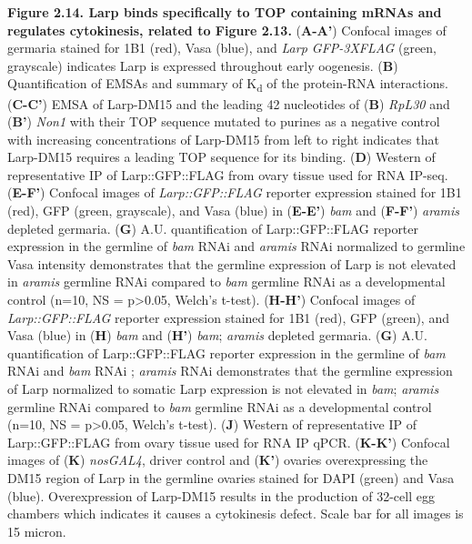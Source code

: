 \documentclass[12pt,oneside]{reedthesis}
\begin{document}
\textbf{\hfill\break
}

\textbf{Figure 2.14. Larp binds specifically to TOP containing mRNAs and regulates cytokinesis, related to Figure 2.13.}
(\textbf{A-A'}) Confocal images of germaria stained for 1B1 (red), Vasa (blue), and \emph{Larp
GFP-3XFLAG} (green, grayscale) indicates Larp is expressed throughout
early oogenesis. (\textbf{B}) Quantification of EMSAs and summary of K\textsubscript{d} of
the protein-RNA interactions. (\textbf{C-C'}) EMSA of Larp-DM15 and the
leading 42 nucleotides of (\textbf{B}) \emph{RpL30} and (\textbf{B'}) \emph{Non1} with their
TOP sequence mutated to purines as a negative control with increasing
concentrations of Larp-DM15 from left to right indicates that Larp-DM15
requires a leading TOP sequence for its binding. (\textbf{D}) Western of
representative IP of Larp::GFP::FLAG from ovary tissue used for RNA
IP-seq. (\textbf{E-F'}) Confocal images of \emph{Larp::GFP::FLAG} reporter
expression stained for 1B1 (red), GFP (green, grayscale), and Vasa
(blue) in (\textbf{E-E'}) \emph{bam} and (\textbf{F-F'}) \emph{aramis} depleted germaria.
(\textbf{G}) A.U. quantification of Larp::GFP::FLAG reporter expression in
the germline of \emph{bam} RNAi and \emph{aramis} RNAi normalized to germline Vasa
intensity demonstrates that the germline expression of Larp is not
elevated in \emph{aramis} germline RNAi compared to \emph{bam} germline RNAi as a
developmental control (n=10, NS = p\textgreater0.05, Welch's t-test). (\textbf{H-H'})
Confocal images of \emph{Larp::GFP::FLAG} reporter expression stained for 1B1
(red), GFP (green), and Vasa (blue) in (\textbf{H}) \emph{bam} and (\textbf{H'}) \emph{bam};
\emph{aramis} depleted germaria. (\textbf{G}) A.U. quantification of
Larp::GFP::FLAG reporter expression in the germline of \emph{bam} RNAi and
\emph{bam} RNAi ; \emph{aramis} RNAi demonstrates that the germline expression of
Larp normalized to somatic Larp expression is not elevated in \emph{bam};
\emph{aramis} germline RNAi compared to \emph{bam} germline RNAi as a
developmental control (n=10, NS = p\textgreater0.05, Welch's t-test). (\textbf{J})
Western of representative IP of Larp::GFP::FLAG from ovary tissue used
for RNA IP qPCR. (\textbf{K-K'}) Confocal images of (\textbf{K}) \emph{nosGAL4}, driver
control and (\textbf{K'}) ovaries overexpressing the DM15 region of Larp in
the germline ovaries stained for DAPI (green) and Vasa (blue).
Overexpression of Larp-DM15 results in the production of 32-cell egg
chambers which indicates it causes a cytokinesis defect. Scale bar for
all images is 15 micron.
\end{document}
